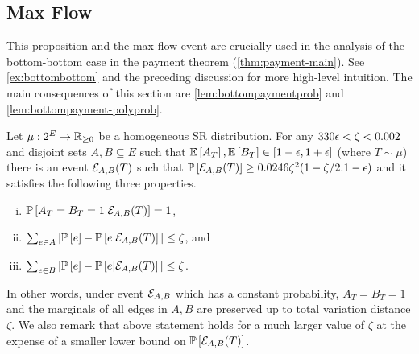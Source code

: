 \subsection{Max Flow}
This proposition and the max flow event are crucially used in the analysis of the bottom-bottom case in the payment theorem (\cref{thm:payment-main}). See \cref{ex:bottombottom} and the preceding discussion for more high-level intuition. The main consequences of this section are \cref{lem:bottompaymentprob} and \cref{lem:bottompayment-polyprob}. 
\begin{proposition}\label{lem:maxflow}
Let $\mu:2^{E} \to\mathbb{R}_{\geq 0}$ be a homogeneous SR distribution. For any $330{\epsilon} <\zeta < 0.002$ and disjoint sets $A,B\subseteq E$ such that  ${\mathbb{E}}\left[A_T\right],{\mathbb{E}}\left[B_T\right] \in [1-{\epsilon},1+{\epsilon}]$ (where $T\sim\mu$) there is an event ${\cal E}_{A,B}(T)$ such that ${\mathbb{P}}\left[{\cal E}_{A,B}(T)\right]\geq 0.0246\zeta^2(1-\zeta/2.1-{\epsilon})$  
and %
it satisfies the following three properties.
\begin{enumerate}[i)]
	\item ${\mathbb{P}}\left[A_T=B_T=1 | {\cal E}_{A,B}(T)\right]=1$,
	\item $\sum_{e\in A} |{\mathbb{P}}\left[e\right] - {\mathbb{P}}\left[e| {\cal E}_{A,B}(T)\right]| \leq \zeta$, and
	\item $\sum_{e\in B} |{\mathbb{P}}\left[e\right] - {\mathbb{P}}\left[e | {\cal E}_{A,B}(T)\right]|\leq \zeta$.
\end{enumerate}	
\end{proposition}
In other words, under event ${\cal E} _{A,B}$ which has a constant probability, $A_T=B_T=1$ and the marginals of all edges in $A,B$ are preserved up to total variation distance $\zeta$. 
We also remark that above statement holds for a much larger value of $\zeta$ at the expense of a smaller lower bound on ${\mathbb{P}}\left[{\cal E}_{A,B}(T)\right]$.

